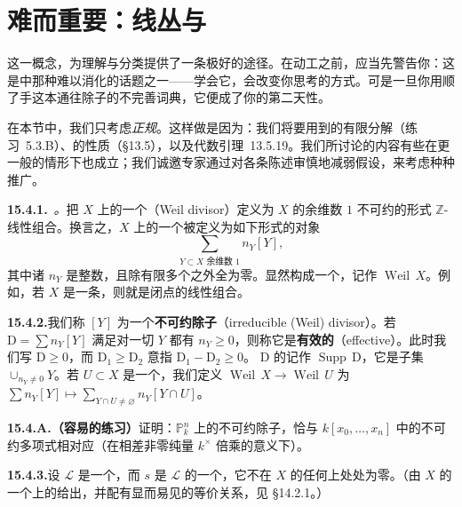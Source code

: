 
\section{难而重要：线丛与\trWeilDivisor}

\trWeilDivisor{}这一概念，为理解与分类\trLineBundle{}提供了一条极好的途径。在动工之前，应当先警告你：这是\trAlgebraicGeometry{}中那种难以消化的话题之一——学会它，会改变你思考\trLineBundle{}的方式。可是一旦你用顺了手这本通往除子的不完善词典，它便成了你的第二天性。

在本节中，我们只考虑\emph{\trNoetherian{}正规\trScheme}。这样做是因为：我们将要用到\trIrreducibleComponent{}的有限分解（\mbox{练习~5.3.B}）、\trDVR{}的性质（\S13.5），以及代数\trHartogs{}引理~13.5.19。我们所讨论的内容有些在更一般的情形下也成立；我们诚邀专家通过对各条陈述审慎地减弱假设，来考虑种种推广。

\textbf{15.4.1.}\ \emph{\trhDefinition{}。}\quad 把 $X$ 上的一个\textbf{\trWeilDivisor}（Weil divisor）定义为 $X$ 的余维数 $1$ 不可约\trClosedSubset{}的形式 $\mathbb{Z}$-线性组合。换言之，$X$ 上的一个\trWeilDivisor{}被定义为如下形式的对象
\[
\sum_{Y\subset X\text{ 余维数 }1}n_Y[Y],
\]
其中诸 $n_Y$ 是整数，且除有限多个之外全为零。\trWeilDivisor{}显然构成一个\trAbelian\trGroup，记作 $\operatorname{Weil}\,X$。例如，若 $X$ 是一条\trCurve，则\trWeilDivisor{}就是闭点的线性组合。

\textbf{15.4.2.}\quad 我们称 $[Y]$ 为一个\textbf{不可约除子}（irreducible (Weil) divisor）。若\trWeilDivisor{} $\mathrm{D}=\sum n_Y[Y]$ 满足对一切 $Y$ 都有 $n_Y\ge 0$，则称它是\textbf{有效的}（effective）。此时我们写 $\mathrm{D}\ge 0$，而 $\mathrm{D}_1\ge\mathrm{D}_2$ 意指 $\mathrm{D}_1-\mathrm{D}_2\ge 0$。\trWeilDivisor{} $\mathrm{D}$ 的\textbf{\trSupport}记作 $\operatorname{Supp}\,\mathrm{D}$，它是子集 $\cup_{n_Y\ne 0}Y$。若 $U\subset X$ 是一个\trOpenSet，我们定义\textbf{\trRestrictionMap} $\operatorname{Weil}\,X\to\operatorname{Weil}\,U$ 为 $\sum n_Y[Y]\mapsto\sum_{Y\cap U\ne\varnothing}n_Y[Y\cap U]$。

\textbf{15.4.A.（容易的练习）}\quad 证明：$\mathbb{P}^n_k$ 上的不可约除子，恰与 $k[x_0,\dots,x_n]$ 中的不可约\trHomogeneous{}多项式相对应（在相差非零纯量 $k^{\times}$ 倍乘的意义下）。

\textbf{15.4.3.}\quad 设 $\mathscr{L}$ 是一个\trInvertibleSheaf，而 $s$ 是 $\mathscr{L}$ 的一个\trRational\trSection，它不在 $X$ 的任何\trIrreducibleComponent{}上处处为零。（\trRational\trSection{}由 $X$ 的一个\trDense\trOpenSubset{}上的\trSection{}给出，并配有显而易见的等价关系，见 \S14.2.1。）

